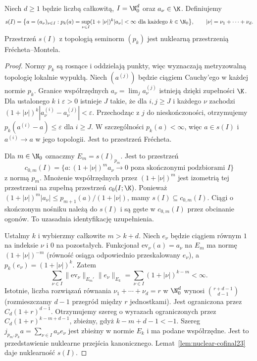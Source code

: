 \begin{twierdzenie}
\label{thm:nuclear-s23}
Niech $d\ge1$ będzie liczbą całkowitą, $I=\N_0^d$
oraz $a_\nu\in\K$. Definiujemy
\[
 s(I)=\bigl\{a=(a_\nu)_{\nu\in I}:
 p_k(a)=\sup_{\nu\in I}(1+|\nu|)^k|a_\nu|<\infty
 \text{ dla każdego }k\in\N_0\bigr\},
 \qquad |\nu|=\nu_1+\cdots+\nu_d.
\]
Przestrzeń $s(I)$ z topologią seminorm $(p_k)$ jest
nuklearną przestrzenią Frécheta--Montela.
\end{twierdzenie}
\begin{proof}
Normy $p_k$ są rosnące i oddzielają punkty, więc
wyznaczają metryzowalną topologię lokalnie wypukłą.
Niech $(a^{(j)})$ będzie ciągiem Cauchy'ego w każdej
normie $p_k$. Granice współrzędnych
$a_\nu=\lim_j a_\nu^{(j)}$ istnieją dzięki zupełności $\K$.
Dla ustalonego $k$ i $\varepsilon>0$ istnieje $J$
takie, że dla $i,j\ge J$ i każdego $\nu$ zachodzi
$(1+|\nu|)^k|a_\nu^{(i)}-a_\nu^{(j)}|<\varepsilon$.
Przechodząc z $j$ do nieskończoności, otrzymujemy
$p_k(a^{(i)}-a)\le\varepsilon$ dla $i\ge J$.
W szczególności $p_k(a)<\infty$, więc $a\in s(I)$
i $a^{(i)}\to a$ w jego topologii. Jest to przestrzeń
Frécheta.

Dla $m\in\N_0$ oznaczmy $E_m=s(I)_{p_m}$.
Jest to przestrzeń
\[
 c_{0,m}(I)=\{a:(1+|\nu|)^m a_\nu\to0
 \text{ poza skończonymi podzbiorami }I\}
\]
z normą $p_m$. Mnożenie współrzędnych przez
$(1+|\nu|)^m$ jest izometrią tej przestrzeni na
zupełną przestrzeń $c_0(I;\K)$. Ponieważ
$(1+|\nu|)^m|a_\nu|\le p_{m+1}(a)/(1+|\nu|)$,
mamy $s(I)\subseteq c_{0,m}(I)$.
Ciągi o skończonym nośniku należą do $s(I)$
i są gęste w $c_{0,m}(I)$ przez obcinanie ogonów.
To uzasadnia identyfikację uzupełnienia.

Ustalmy $k$ i wybierzmy całkowite $m>k+d$.
Niech $e_\nu$ będzie ciągiem równym $1$ na indeksie $\nu$
i $0$ na pozostałych. Funkcjonał
$\mathrm{ev}_\nu(a)=a_\nu$ na $E_m$ ma normę
$(1+|\nu|)^{-m}$ (równość osiąga odpowiednio
przeskalowany $e_\nu$), a $p_k(e_\nu)=(1+|\nu|)^k$.
Zatem
\[
 \sum_{\nu\in I}\|\mathrm{ev}_\nu\|_{E_m'}
 \|e_\nu\|_{E_k}
 =\sum_{\nu\in I}(1+|\nu|)^{k-m}<\infty.
\]
Istotnie, liczba rozwiązań równania
$\nu_1+\cdots+\nu_d=r$ w $\N_0^d$ wynosi
$\binom{r+d-1}{d-1}$ (rozmieszczamy $d-1$
przegród między $r$ jednostkami).
Jest ograniczona przez $C_d(1+r)^{d-1}$.
Otrzymujemy szereg o wyrazach ograniczonych przez
$C_d(1+r)^{k-m+d-1}$, zbieżny, gdyż
$k-m+d-1<-1$. Szereg
$j_{p_m,p_k}a=\sum_{\nu\in I}a_\nu e_\nu$
jest zbieżny w normie $E_k$ i ma podane współrzędne.
Jest to przedstawienie nuklearne przejścia kanonicznego.
Lemat~\ref{lem:nuclear-cofinal23} daje nuklearność $s(I)$.


\end{proof}
